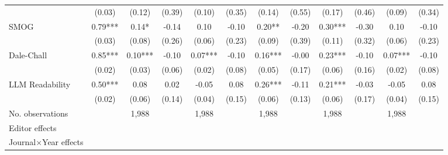 \begin{table}
\begin{threeparttable}
\begin{tabular}{p{3cm}S@{}S@{}S@{}S@{}S@{}S@{}S@{}S@{}S@{}S@{}S@{}}
                                          &      (0.03)   &      (0.12)   &      (0.39)   &      (0.10)   &      (0.35)   &      (0.14)   &      (0.55)   &      (0.17)   &      (0.46)   &      (0.09)   &      (0.34)   \\
            SMOG                          &        0.79***&        0.14*  &       -0.14   &        0.10   &       -0.10   &        0.20** &       -0.20   &        0.30***&       -0.30   &        0.10   &       -0.10   \\
                                          &      (0.03)   &      (0.08)   &      (0.26)   &      (0.06)   &      (0.23)   &      (0.09)   &      (0.39)   &      (0.11)   &      (0.32)   &      (0.06)   &      (0.23)   \\
            Dale-Chall                    &        0.85***&        0.10***&       -0.10   &        0.07***&       -0.10   &        0.16***&       -0.00   &        0.23***&       -0.10   &        0.07***&       -0.10   \\
                                          &      (0.02)   &      (0.03)   &      (0.06)   &      (0.02)   &      (0.08)   &      (0.05)   &      (0.17)   &      (0.06)   &      (0.16)   &      (0.02)   &      (0.08)   \\
            LLM Readability        &        0.50***&        0.08   &        0.02   &       -0.05   &        0.08   &        0.26***&       -0.11   &        0.21***&       -0.03   &       -0.05   &        0.08   \\
                                          &      (0.02)   &      (0.06)   &      (0.14)   &      (0.04)   &      (0.15)   &      (0.06)   &      (0.13)   &      (0.06)   &      (0.17)   &      (0.04)   &      (0.15)   \\
            \midrule
            No. observations              &               &       1,988   &               &       1,988   &               &       1,988   &               &       1,988   &               &       1,988   &               \\
            \midrule
            Editor effects        &               &           {}   &               &           {}   &               &           {}   &               &           {}   &               &               &               \\
            Journal\(\times\)Year effects          &               &           {}   &               &           {}   &               &           {}   &               &           {}   &               &               &               \\

\end{tabular}
\end{threeparttable}
\end{table}
